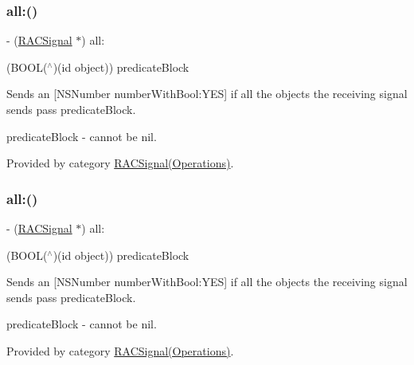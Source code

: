\subsubsection{\texorpdfstring{all\+:()}{all:()}\hspace{0.1cm}{\footnotesize\ttfamily [2/3]}}
{\footnotesize\ttfamily -\/ (\mbox{\hyperlink{interface_r_a_c_signal}{R\+A\+C\+Signal}} $\ast$) all\+: \begin{DoxyParamCaption}\item[{(B\+O\+OL($^\wedge$)(id object))}]{predicate\+Block }\end{DoxyParamCaption}}

Sends an \mbox{[}N\+S\+Number number\+With\+Bool\+:Y\+ES\mbox{]} if all the objects the receiving signal sends pass {\ttfamily predicate\+Block}.

predicate\+Block -\/ cannot be nil. 

Provided by category \mbox{\hyperlink{category_r_a_c_signal_07_operations_08_adb70e0b813cec0b7bcc5c76f2f3cd88f}{R\+A\+C\+Signal(\+Operations)}}.

\mbox{\label{interface_r_a_c_signal_adb70e0b813cec0b7bcc5c76f2f3cd88f}} 
\subsubsection{\texorpdfstring{all\+:()}{all:()}\hspace{0.1cm}{\footnotesize\ttfamily [3/3]}}
{\footnotesize\ttfamily -\/ (\mbox{\hyperlink{interface_r_a_c_signal}{R\+A\+C\+Signal}} $\ast$) all\+: \begin{DoxyParamCaption}\item[{(B\+O\+OL($^\wedge$)(id object))}]{predicate\+Block }\end{DoxyParamCaption}}

Sends an \mbox{[}N\+S\+Number number\+With\+Bool\+:Y\+ES\mbox{]} if all the objects the receiving signal sends pass {\ttfamily predicate\+Block}.

predicate\+Block -\/ cannot be nil. 

Provided by category \mbox{\hyperlink{category_r_a_c_signal_07_operations_08_adb70e0b813cec0b7bcc5c76f2f3cd88f}{R\+A\+C\+Signal(\+Operations)}}.

\mbox{\label{interface_r_a_c_signal_a4a12f1ef58487260894d1ef37dbb9c9d}} 
